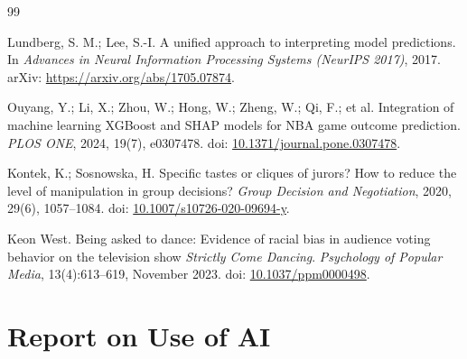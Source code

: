 \documentclass{mcmthesis}
\begin{document}
\begin{thebibliography}{99}
	
	Lundberg, S. M.; Lee, S.-I.
	\newblock A unified approach to interpreting model predictions.
	\newblock In \emph{Advances in Neural Information Processing Systems (NeurIPS 2017)}, 2017.
	\newblock arXiv: \url{https://arxiv.org/abs/1705.07874}.
	
	Ouyang, Y.; Li, X.; Zhou, W.; Hong, W.; Zheng, W.; Qi, F.; et al.
	\newblock Integration of machine learning XGBoost and SHAP models for NBA game outcome prediction.
	\newblock \emph{PLOS ONE}, 2024, 19(7), e0307478.
	\newblock doi: \href{https://doi.org/10.1371/journal.pone.0307478}{10.1371/journal.pone.0307478}.
	
	Kontek, K.; Sosnowska, H.
	\newblock Specific tastes or cliques of jurors? How to reduce the level of manipulation in group decisions?
	\newblock \emph{Group Decision and Negotiation}, 2020, 29(6), 1057--1084.
	\newblock doi: \href{https://doi.org/10.1007/s10726-020-09694-y}{10.1007/s10726-020-09694-y}.
	
	Keon West.
	Being asked to dance: Evidence of racial bias in audience voting behavior on the television show \emph{Strictly Come Dancing}.
	\emph{Psychology of Popular Media}, 13(4):613--619, November 2023.
	doi: \href{https://doi.org/10.1037/ppm0000498}{10.1037/ppm0000498}.
\end{thebibliography}


\newpage
\section*{Report on Use of AI}
\end{document}
